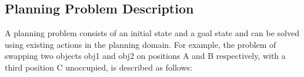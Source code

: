 

\subsection{Planning Problem Description}\label{subsec:PPDescription}
A planning problem consists of an initial state and a goal state and can be solved using existing actions in the planning domain.
For example, the problem of swapping two objects obj1 and obj2 on positions A and B respectively, with a third position C unoccupied, is described as follows:


